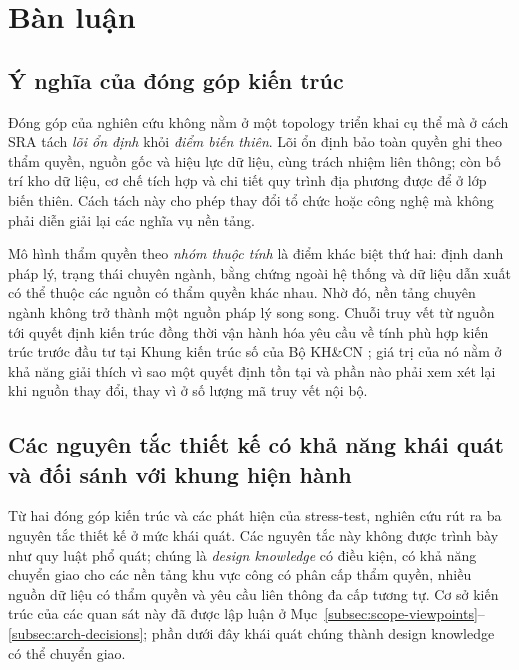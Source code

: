 \section{Bàn luận}
\label{sec:discussion}

\subsection{Ý nghĩa của đóng góp kiến trúc}
\label{subsec:delta}

Đóng góp của nghiên cứu không nằm ở một topology triển khai cụ thể mà ở cách SRA tách \emph{lõi ổn định} khỏi \emph{điểm biến thiên}. Lõi ổn định bảo toàn quyền ghi theo thẩm quyền, nguồn gốc và hiệu lực dữ liệu, cùng trách nhiệm liên thông; còn bố trí kho dữ liệu, cơ chế tích hợp và chi tiết quy trình địa phương được để ở lớp biến thiên. Cách tách này cho phép thay đổi tổ chức hoặc công nghệ mà không phải diễn giải lại các nghĩa vụ nền tảng.

Mô hình thẩm quyền theo \emph{nhóm thuộc tính} là điểm khác biệt thứ hai: định danh pháp lý, trạng thái chuyên ngành, bằng chứng ngoài hệ thống và dữ liệu dẫn xuất có thể thuộc các nguồn có thẩm quyền khác nhau. Nhờ đó, nền tảng chuyên ngành không trở thành một nguồn pháp lý song song. Chuỗi truy vết từ nguồn tới quyết định kiến trúc đồng thời vận hành hóa yêu cầu về tính phù hợp kiến trúc trước đầu tư tại Khung kiến trúc số của Bộ KH\&CN \citep{qd1973_2026}; giá trị của nó nằm ở khả năng giải thích vì sao một quyết định tồn tại và phần nào phải xem xét lại khi nguồn thay đổi, thay vì ở số lượng mã truy vết nội bộ.

\subsection{Các nguyên tắc thiết kế có khả năng khái quát và đối sánh với khung hiện hành}
\label{subsec:design-principles}

Từ hai đóng góp kiến trúc và các phát hiện của stress-test, nghiên cứu rút ra ba nguyên tắc thiết kế ở mức khái quát. Các nguyên tắc này không được trình bày như quy luật phổ quát; chúng là \emph{design knowledge} có điều kiện, có khả năng chuyển giao cho các nền tảng khu vực công có phân cấp thẩm quyền, nhiều nguồn dữ liệu có thẩm quyền và yêu cầu liên thông đa cấp tương tự. Cơ sở kiến trúc của các quan sát này đã được lập luận ở Mục~\ref{subsec:scope-viewpoints}--\ref{subsec:arch-decisions}; phần dưới đây khái quát chúng thành design knowledge có thể chuyển giao.

